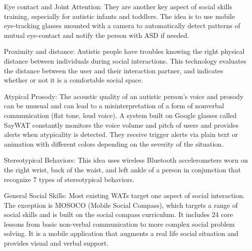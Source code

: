 Eye contact and Joint Attention: They are another key aspect of social skills training, especially for autistic infants and toddlers. The idea is to use mobile eye-tracking glasses mounted with a camera to automatically detect patterns of mutual eye-contact and notify the person with ASD if needed.

Proximity and distance: Autistic people have troubles knowing the right physical distance between individuals during social interactions. This technology evaluates the distance between the user and their interaction partner, and indicates whether or not it is a comfortable social space. 

Atypical Prosody: The acoustic quality of an autistic person’s voice and prosody can be unusual and can lead to a misinterpretation of a form of nonverbal communication (flat tone, loud voice). A system built on Google glasses called SayWAT constantly monitors the voice volume and pitch of users and provides alerts when atypicality is detected. They receive trigger alerts via plain text or animation with different colors depending on the severity of the situation.
 
Stereotypical Behaviors: This idea uses wireless Bluetooth accelerometers worn on the right wrist, back of the waist, and left ankle of a person in conjunction that recognize 7 types of stereotypical behaviors. 

General Social Skills: Most existing WATs target one aspect of social interaction. The exception is MOSOCO (Mobile Social Compass), which targets a range of social skills and is built on the social compass curriculum. It includes 24 core lessons from basic non-verbal communication to more complex social problem solving. It is a mobile application that augments a real life social situation and provides visual and verbal support.
